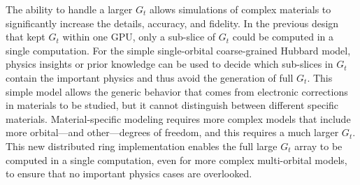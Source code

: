 % 

The ability to handle a larger $G_t$  allows simulations of complex materials to significantly increase the details, accuracy, and fidelity.
%
In the previous design that kept $G_t$ within one GPU, only a
sub-slice of $G_t$ could be computed in a single computation.
%
For the simple single-orbital coarse-grained Hubbard model, physics insights or prior
knowledge can be used to decide which sub-slices in $G_t$
contain the important physics and thus avoid the generation of full $G_t$.
%
This simple model allows the generic behavior that comes
from electronic corrections in materials to be studied, but it cannot distinguish between
different specific materials.
%
Material-specific modeling requires more complex models
that include more orbital---and other---degrees of freedom, and
this requires a much larger $G_t$. 
%
This new distributed ring implementation enables the full large $G_t$
array to be computed in a single computation, even for more
complex multi-orbital models, to ensure that no important 
physics cases are overlooked.
%




